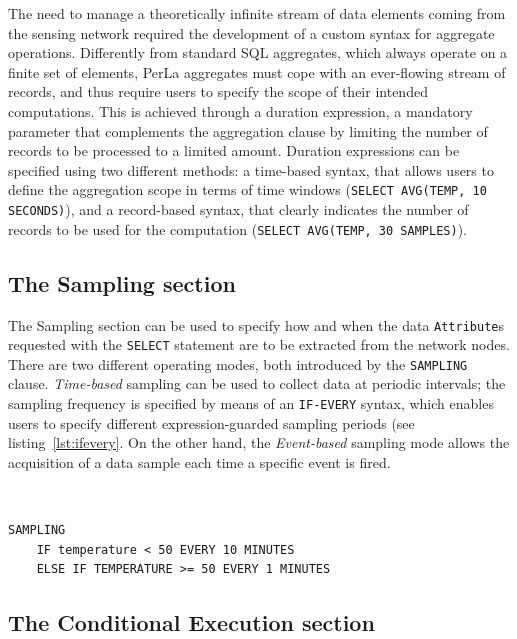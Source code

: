 The need to manage a theoretically infinite stream of data elements coming from
the sensing network required the development of a custom syntax for aggregate
operations. Differently from standard SQL aggregates, which always operate on a
finite set of elements, PerLa aggregates must cope with an ever-flowing stream
of records, and thus require users to specify the scope of their intended
computations. This is achieved through a duration expression, a mandatory
parameter that complements the aggregation clause by limiting the number of
records to be processed to a limited amount. Duration expressions can be
specified using two different methods: a time-based syntax, that allows users
to define the aggregation scope in terms of time windows (\lstinline!SELECT AVG(TEMP, 10 SECONDS)!),
and a record-based syntax, that clearly indicates the
number of records to be used for the computation (\lstinline!SELECT AVG(TEMP, 30 SAMPLES)!).

\subsection{The Sampling section}

The Sampling section can be used to specify how and when the data
\texttt{Attribute}s requested with the \texttt{SELECT} statement are to be
extracted from the network nodes. There are two different operating modes, both
introduced by the \texttt{SAMPLING} clause. \textit{Time-based} sampling can be
used to collect data at periodic intervals; the sampling frequency is specified
by means of an \texttt{IF-EVERY} syntax, which enables users to specify
different expression-guarded sampling periods (see listing~\ref{lst:ifevery}.
On the other hand, the \textit{Event-based} sampling mode allows the
acquisition of a data sample each time a specific event is fired.

~\\
\begin{lstlisting}[label={lst:ifevery},caption={An example of time-based sampling, which shows how
the sampling frequency can be increased as the monitored phenomenon evolves.}]
SAMPLING
    IF temperature < 50 EVERY 10 MINUTES
    ELSE IF TEMPERATURE >= 50 EVERY 1 MINUTES
\end{lstlisting}

\subsection{The Conditional Execution section}

